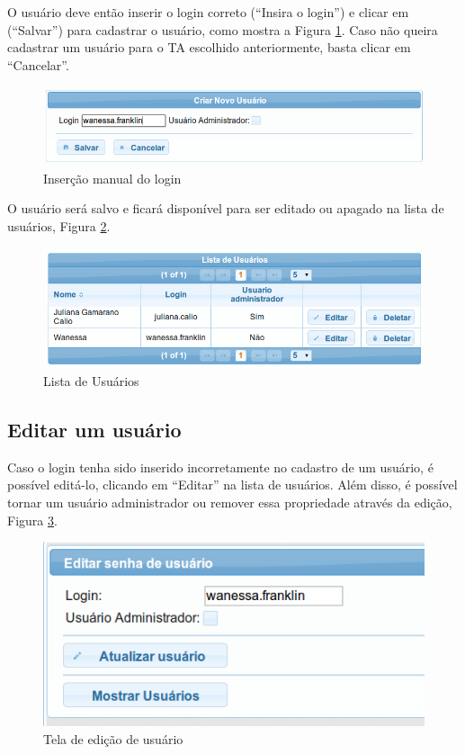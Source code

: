 \documentclass[openany,10pt,a4paper]{book}
\begin{document}
O usuário deve então inserir o login correto (``Insira o login'') e clicar em (``Salvar'') para cadastrar o usuário, como mostra a Figura \ref{loginWanessa}. Caso não queira cadastrar um usuário para o TA escolhido anteriormente, basta clicar em ``Cancelar''.

\begin{figure}[!htb]
    \centering
    \includegraphics[scale=0.5]{loginWanessa.png}
    \caption{Inserção manual do login}
    \label{loginWanessa}
\end{figure}

O usuário será salvo e ficará disponível para ser editado ou apagado na lista de usuários, Figura \ref{listaUsuarios}.

\begin{figure}[!htb]
    \centering
    \includegraphics[scale=0.5]{listaUsuarios.png}
    \caption{Lista de Usuários}
    \label{listaUsuarios}
\end{figure}

\subsection{Editar um usuário}

Caso o login tenha sido inserido incorretamente no cadastro de um usuário, é possível editá-lo, clicando em ``Editar'' na lista de usuários. Além disso, é possível tornar um usuário administrador ou remover essa propriedade através da edição, Figura \ref{editarUsuario}.

\begin{figure}[!htb]
    \centering
    \includegraphics[scale=0.5]{editarUsuario.png}
    \caption{Tela de edição de usuário}
    \label{editarUsuario}
\end{figure}
\end{document}
